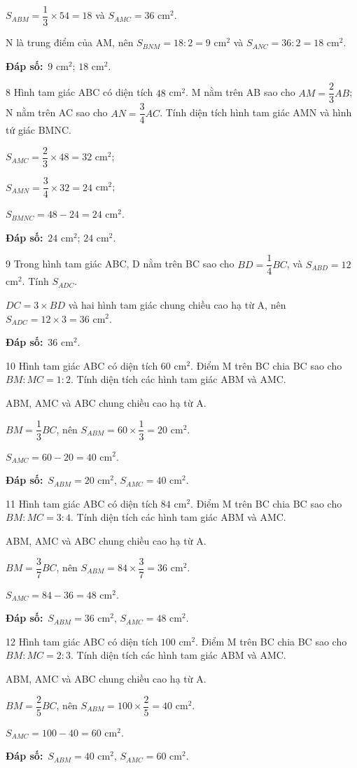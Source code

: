 \documentclass[11pt]{article}
\newif\ifsol \solfalse
\providecommand{\AnsWord}{Đáp số}
\newcommand{\dapso}[1]{\par\textbf{\AnsWord:}\ #1}
\newcommand{\probsol}[1]{%
  \begin{lrbox}{\solmeasure}\begin{minipage}{\dimexpr\linewidth-24pt\relax}#1\end{minipage}\end{lrbox}%
  \ifsol
    \begin{solbox}#1\end{solbox}%
  \else
    \setlength{\solht}{\dimexpr\ht\solmeasure+\dp\solmeasure+0.85cm\relax}%
    \ifdim\solht<1.35cm\setlength{\solht}{1.35cm}\fi
    \begin{tcolorbox}[colback=white,colframe=Line,boxrule=0.8pt,arc=5pt,
      left=8pt,right=8pt,top=4pt,bottom=4pt,height=\solht]{\footnotesize\color{Slate}\itshape\WorkWord}\end{tcolorbox}%
  \fi}
\newcommand{\gap}{\vspace{0.3cm}}
\def\WorkWord{Bài làm:}
\def\AnsWord{Đáp số}
\begin{document}
\probsol{
$S_{ABM}=\dfrac13\times54=18$ và $S_{AMC}=36$ cm$^2$.\par N là trung điểm của AM, nên $S_{BNM}=18:2=9$ cm$^2$ và $S_{ANC}=36:2=18$ cm$^2$.
\dapso{$9$ cm$^2$; $18$ cm$^2$.}}
\gap
\begin{probbox}{8}{\relax}
Hình tam giác ABC có diện tích $48$ cm$^2$. M nằm trên AB sao cho $AM=\dfrac23AB$; N nằm trên AC sao cho $AN=\dfrac34AC$. Tính diện tích hình tam giác AMN và hình tứ giác BMNC.
\end{probbox}
\probsol{
$S_{AMC}=\dfrac23\times48=32$ cm$^2$;\par $S_{AMN}=\dfrac34\times32=24$ cm$^2$;\par $S_{BMNC}=48-24=24$ cm$^2$.
\dapso{$24$ cm$^2$; $24$ cm$^2$.}}
\gap
\begin{probbox}{9}{\relax}
Trong hình tam giác ABC, D nằm trên BC sao cho $BD=\dfrac14BC$, và $S_{ABD}=12$ cm$^2$. Tính $S_{ADC}$.
\end{probbox}
\probsol{
$DC=3\times BD$ và hai hình tam giác chung chiều cao hạ từ A, nên $S_{ADC}=12\times3=36$ cm$^2$.
\dapso{$36$ cm$^2$.}}
\gap
\begin{probbox}{10}{\relax}
Hình tam giác ABC có diện tích $60$ cm$^2$. Điểm M trên BC chia BC sao cho $BM:MC=1:2$. Tính diện tích các hình tam giác ABM và AMC.
\end{probbox}
\probsol{
ABM, AMC và ABC chung chiều cao hạ từ A.\par $BM=\dfrac{1}{3}BC$, nên $S_{ABM}=60\times\dfrac{1}{3}=20$ cm$^2$.\par $S_{AMC}=60-20=40$ cm$^2$.
\dapso{$S_{ABM}=20$ cm$^2$, $S_{AMC}=40$ cm$^2$.}}
\gap
\begin{probbox}{11}{\relax}
Hình tam giác ABC có diện tích $84$ cm$^2$. Điểm M trên BC chia BC sao cho $BM:MC=3:4$. Tính diện tích các hình tam giác ABM và AMC.
\end{probbox}
\probsol{
ABM, AMC và ABC chung chiều cao hạ từ A.\par $BM=\dfrac{3}{7}BC$, nên $S_{ABM}=84\times\dfrac{3}{7}=36$ cm$^2$.\par $S_{AMC}=84-36=48$ cm$^2$.
\dapso{$S_{ABM}=36$ cm$^2$, $S_{AMC}=48$ cm$^2$.}}
\gap
\begin{probbox}{12}{\relax}
Hình tam giác ABC có diện tích $100$ cm$^2$. Điểm M trên BC chia BC sao cho $BM:MC=2:3$. Tính diện tích các hình tam giác ABM và AMC.
\end{probbox}
\probsol{
ABM, AMC và ABC chung chiều cao hạ từ A.\par $BM=\dfrac{2}{5}BC$, nên $S_{ABM}=100\times\dfrac{2}{5}=40$ cm$^2$.\par $S_{AMC}=100-40=60$ cm$^2$.
\dapso{$S_{ABM}=40$ cm$^2$, $S_{AMC}=60$ cm$^2$.}}
\end{document}
